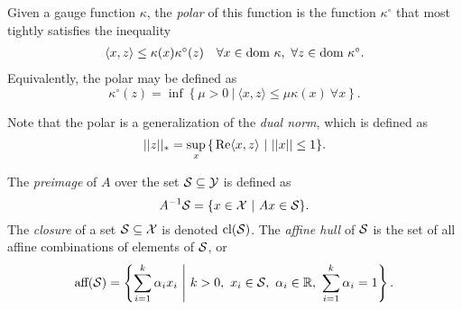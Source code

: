 \begin{enumerate}
Given a gauge function $\kappa$, the \textit{polar} of this function is the function $\kappa^\circ$ that most tightly satisfies the inequality
\begin{equation}  			\label{Def:polar_function_1}
\begin{array}{ll}
	\langle x, z \rangle \leq \kappa(x) \kappa^\circ(z)
			&	\forall x \in \textnormal{dom} \ \kappa, \ \forall z \in \textnormal{dom} \ \kappa^\circ.
\end{array}
\end{equation}
Equivalently, the polar may be defined as \cite[Section 15]{rockafellar1970convex}
\begin{equation}  			\label{Def:polar_function_2}
\kappa^\circ(z) = \inf \left\{ \mu > 0 \ | \ \langle x, z \rangle \leq \mu \kappa(x) \ \forall x \right\}.
\end{equation}



Note that the polar is a generalization of the \textit{dual norm}, which is defined as
\begin{equation}			\label{Def:dual_norm}
||z||_* = \sup_{x} \hspace{0.05cm} \{ \hspace{0.05cm} \mathrm{Re} \langle x, z \rangle \ | \ ||x|| \leq 1 \}.
\end{equation}

The \textit{preimage} of $A$ over the set ${\mathcal S} \subseteq {\mathcal Y}$ is defined as 
\begin{equation} 			\label{Def:preimage}
A^{-1} {\mathcal S} = \{ x \in {\mathcal X} \ | \ Ax \in {\mathcal S} \}.
\end{equation}
The \textit{closure} of a set ${\mathcal S} \subseteq {\mathcal X}$ is denoted $\textnormal{cl}({\mathcal S})$. The \textit{affine hull} of ${\mathcal S}$ is the set of all affine combinations of elements of ${\mathcal S}$, or
\begin{equation}			\label{Def:affine_hull}
\text{aff}({\mathcal S}) = \left\{ \sum_{i=1}^k \alpha_i x_i \ \middle| \ k > 0, \ x_i \in {\mathcal S}, \ \alpha_i \in {\mathbb R}, \ \sum_{i=1}^k \alpha_i = 1 \right\}.
\end{equation}


\end{enumerate}
